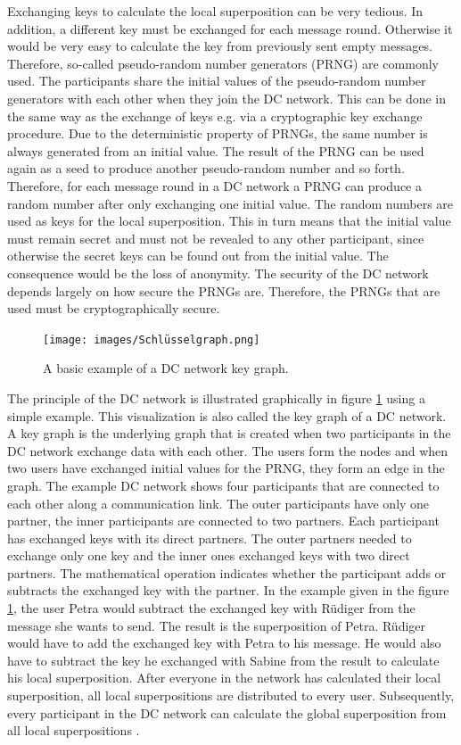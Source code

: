 Exchanging keys to calculate the local superposition can be very tedious. In addition, a different key must be exchanged for each message round. Otherwise it would be very easy to calculate the key from previously sent empty messages. Therefore, so-called pseudo-random number generators (PRNG) are commonly used. The participants share the initial values of the pseudo-random number generators with each other when they join the DC network. This can be done in the same way as the exchange of keys e.g. via a cryptographic key exchange procedure. Due to the deterministic property of PRNGs, the same number is always generated from an initial value. The result of the PRNG can be used again as a seed to produce another pseudo-random number and so forth. Therefore, for each message round in a DC network a PRNG can produce a random number after only exchanging one initial value. The random numbers are used as keys for the local superposition. This in turn means that the initial value must remain secret and must not be revealed to any other participant, since otherwise the secret keys can be found out from the initial value. The consequence would be the loss of anonymity. The security of the DC network depends largely on how secure the PRNGs are. Therefore, the PRNGs that are used must be cryptographically secure.\\
\begin{figure}[tbp]
  \centering
  \texttt{[image: images/Schlüsselgraph.png]}
  \caption[DC Network Key Graph]{A basic example of a DC network key graph\cite{stephan_escher}.}
  \label{fig:keygraph}
\end{figure}
The principle of the DC network is illustrated graphically in figure \ref{fig:keygraph} using a simple example. This visualization is also called the key graph of a DC network. A key graph is the underlying graph that is created when two participants in the DC network exchange data with each other. The users form the nodes and when two users have exchanged initial values for the PRNG, they form an edge in the graph. The example DC network shows four participants that are connected to each other along a communication link. The outer participants have only one partner, the inner participants are connected to two partners. Each participant has exchanged keys with its direct partners. The outer partners needed to exchange only one key and the inner ones exchanged keys with two direct partners.
The mathematical operation indicates whether the participant adds or subtracts the exchanged key with the partner. In the example given in the figure \ref{fig:keygraph}, the user Petra would subtract the exchanged key with Rüdiger from the message she wants to send. The result is the superposition of Petra. Rüdiger would have to add the exchanged key with Petra to his message. He would also have to subtract the key he exchanged with Sabine from the result to calculate his local superposition. After everyone in the network has calculated their local superposition, all local superpositions are distributed to every user. Subsequently, every participant in the DC network can calculate the global superposition from all local superpositions \cite{stephan_escher}\cite{pfitzmann2006security}.

